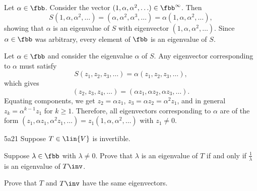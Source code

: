 \begin{solenum}
    \item Let $\alpha \in \fbb$.
	Consider the vector $(1, \alpha, \alpha^2, \ldots) \in \fbb^\infty$.
	Then
    \[
    	S(1, \alpha, \alpha^2, \ldots) = (\alpha, \alpha^2, \alpha^3, \ldots) = \alpha (1, \alpha, \alpha^2, \ldots),
    \]
    showing that $\alpha$ is an eigenvalue of $S$ with eigenvector $(1, \alpha, \alpha^2, \ldots)$.
	Since $\alpha \in \fbb$ was arbitrary, every element of $\fbb$ is an eigenvalue of $S$.
    \item Let $\alpha \in \fbb$ and consider the eigenvalue $\alpha$ of $S$.
	Any eigenvector corresponding to $\alpha$ must satisfy
    \[
    	S(z_1, z_2, z_3, \ldots) = \alpha (z_1, z_2, z_3, \ldots),
    \]
    which gives
    \[
    	(z_2, z_3, z_4, \ldots) = (\alpha z_1, \alpha z_2, \alpha z_3, \ldots).
    \]
    Equating components, we get $z_2 = \alpha z_1$, $z_3 = \alpha z_2 = \alpha^2 z_1$, and in general $z_k = \alpha^{k-1} z_1$ for $k \geq 1$.
	Therefore, all eigenvectors corresponding to $\alpha$ are of the form $(z_1, \alpha z_1, \alpha^2 z_1, \ldots) = z_1 (1, \alpha, \alpha^2, \ldots)$ with $z_1 \neq 0$.
\end{solenum}

\begin{exercise}{5a21}
    Suppose $T \in \lin{V}$ is invertible.
    \begin{subexercises}
        \item Suppose $\lambda \in \fbb$ with $\lambda \neq 0$.
	Prove that $\lambda$ is an eigenvalue of $T$ if and only if $\frac{1}{\lambda}$ is an eigenvalue of $T\inv$.
        \item Prove that $T$ and $T\inv$ have the same eigenvectors.
    \end{subexercises}
\end{exercise}

